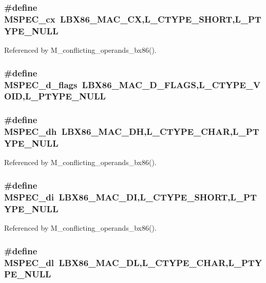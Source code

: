 \subsubsection{\setlength{\rightskip}{0pt plus 5cm}\#define MSPEC\_\-cx~LBX86\_\-MAC\_\-CX,L\_\-CTYPE\_\-SHORT,L\_\-PTYPE\_\-NULL}\label{ml__bx86_8c_c307b8d03714d712d0f235624a72ad45}




Referenced by M\_\-conflicting\_\-operands\_\-bx86().
\subsubsection{\setlength{\rightskip}{0pt plus 5cm}\#define MSPEC\_\-d\_\-flags~LBX86\_\-MAC\_\-D\_\-FLAGS,L\_\-CTYPE\_\-VOID,L\_\-PTYPE\_\-NULL}\label{ml__bx86_8c_1166aef863b0151d39a47c0e583d9a3b}


\subsubsection{\setlength{\rightskip}{0pt plus 5cm}\#define MSPEC\_\-dh~LBX86\_\-MAC\_\-DH,L\_\-CTYPE\_\-CHAR,L\_\-PTYPE\_\-NULL}\label{ml__bx86_8c_1877660032ba6eceb5f47b8b9f9fd917}




Referenced by M\_\-conflicting\_\-operands\_\-bx86().
\subsubsection{\setlength{\rightskip}{0pt plus 5cm}\#define MSPEC\_\-di~LBX86\_\-MAC\_\-DI,L\_\-CTYPE\_\-SHORT,L\_\-PTYPE\_\-NULL}\label{ml__bx86_8c_eba23f1422a3fe978fb3820f089ddeca}




Referenced by M\_\-conflicting\_\-operands\_\-bx86().
\subsubsection{\setlength{\rightskip}{0pt plus 5cm}\#define MSPEC\_\-dl~LBX86\_\-MAC\_\-DL,L\_\-CTYPE\_\-CHAR,L\_\-PTYPE\_\-NULL}\label{ml__bx86_8c_00724c824ed6b4eec78a093b13ab7bfb}




